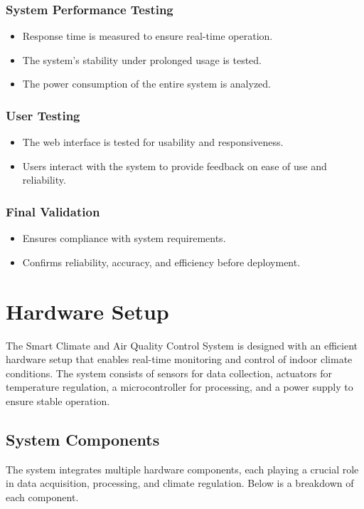 \documentclass[a4paper]{scrartcl}
\begin{document}
\subsubsection{System Performance Testing}
\begin{itemize}
\item Response time is measured to ensure real-time operation.
\item The system's stability under prolonged usage is tested.
\item The power consumption of the entire system is analyzed.
\end{itemize}

\subsubsection{User Testing}
\begin{itemize}
\item The web interface is tested for usability and responsiveness.
\item Users interact with the system to provide feedback on ease of use and reliability.
\end{itemize}

\subsubsection{Final Validation}
\begin{itemize}
\item Ensures compliance with system requirements.
\item Confirms reliability, accuracy, and efficiency before deployment.
\end{itemize}


\section{Hardware Setup}
The Smart Climate and Air Quality Control System is designed with an efficient hardware setup that enables real-time monitoring and control of indoor climate conditions. The system consists of sensors for data collection, actuators for temperature regulation, a microcontroller for processing, and a power supply to ensure stable operation.

\subsection{System Components}
The system integrates multiple hardware components, each playing a crucial role in data acquisition, processing, and climate regulation. Below is a breakdown of each component.
\end{document}
